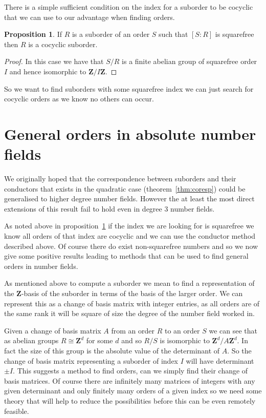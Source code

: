 \documentclass[12pt,a4paper,abstracton,bibtotoc]{scrreprt}
\theoremstyle{definition}
\newtheorem{prop}{Proposition}
\newcommand{\ZZ}{\mathbf{Z}}
\begin{document}
There is a simple sufficient condition on the index for a suborder to be cocyclic that we can use to our advantage when finding orders.

\begin{prop}
\label{prop:sqfree}
If $R$ is a suborder of an order $S$ such that $[S:R]$ is squarefree then $R$ is a cocyclic suborder.
\end{prop}

\begin{proof}
In this case we have that $S/R$ is a finite abelian group of squarefree order $I$ and hence isomorphic to $\ZZ/I\ZZ$.
\end{proof}

So we want to find suborders with some squarefree index we can just search for cocyclic orders as we know no others can occur.

\section{General orders in absolute number fields}

We originally hoped that the correspondence between suborders and their conductors that exists in the quadratic case (theorem~\ref{thm:coresp}) could be generalised to higher degree number fields.
However the at least the most direct extensions of this result fail to hold even in degree 3 number fields.

As noted above in proposition~\ref{prop:sqfree} if the index we are looking for is squarefree we know all orders of that index are cocyclic and we can use the conductor method described above.
Of course there do exist non-squarefree numbers and so we now give some positive results leading to methods that can be used to find general orders in number fields.

As mentioned above to compute a suborder we mean to find a representation of the $\ZZ$-basis of the suborder in terms of the basis of the larger order.
We can represent this as a change of basis matrix with integer entries, as all orders are of the same rank it will be square of size the degree of the number field worked in.

Given a change of basis matrix $A$ from an order $R$ to an order $S$ we can see that as abelian groups $R \cong \ZZ^d$ for some $d$ and so $R/S$ is isomorphic to $\ZZ^d/A\ZZ^d$.
In fact the size of this group is the absolute value of the determinant of $A$.
So the change of basis matrix representing a suborder of index $I$ will have determinant $\pm I$.
This suggests a method to find orders, can we simply find their change of basis matrices.
Of course there are infinitely many matrices of integers with any given determinant and only finitely many orders of a given index so we need some theory that will help to reduce the possibilities before this can be even remotely feasible.
\end{document}
